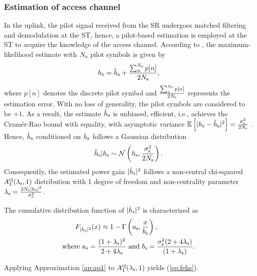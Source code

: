 \subsubsection{Estimation of access channel}
In the uplink, the pilot signal received from the SR undergoes matched filtering and demodulation at the ST, hence, a pilot-based estimation is employed at the ST to acquire the knowledge of the access channel. According to \cite{Gifford08}, the maximum-likelihood estimate with $N_{\text{s}}$ pilot symbols is given by 
\begin{align}
h_{\text{s}} = \hat{h}_{\text{s}} + \frac{\sum^{N_{\text{s}}}_{n} p[n]}{2 N_{\text{s}}},
\label{eq:pilot_MLE}
\end{align}
where $p[n]$ denotes the discrete pilot symbol and $\frac{\sum^{N_{\text{s}}}_{n} p[n]}{2 N_{\text{s}}}$ represents the estimation error. With no loss of generality, the pilot symbols are considered to be $+1$.
As a result, the estimate $\hat{h}_{\text{s}}$ is unbiased, efficient, i.e., achieves the Cram\'er-Rao bound with equality, with asymptotic variance ${\mathbb E}_{}\left[ |h_{\text{s}} -\hat{h}_{\text{s}}|^2 \right] = \frac{\sigma^2_{\text{s}}}{2 N_{\text{s}}}$ \cite{Gifford08}. Hence, $\hat{h}_{\text{s}}$ conditioned on $h_{\text{s}}$ follows a Gaussian distribution
\begin{align}
\hat{h}_{\text{s}}|h_{\text{s}} \sim \mathcal{N}\left( h_{\text{s}},\frac{\sigma^2_{\text{s}}}{2 N_{\text{s}}} \right).
\label{eq:ehs} 
\end{align}
Consequently, the estimated power gain $|\hat{h}_{\text{s}}|^2$ follows a non-central chi-squared $\ncchi2(\ls, 1)$ distribution with 1 degree of freedom and non-centrality parameter $\lambda_{\text{s}} = \frac{2 N_{\text{s}} |h_{\text{s}}|^2}{\sigma^2_{\text{s}}}$. 
\begin{lemma} \label{lm:lm2}
\normalfont
The cumulative distribution function of $|\hat{h}_{\text{s}}|^2$ is characterized as 
\begin{align}
F_{|\hat{h}_{\text{s}}|^2}(x) \approx 1 - \Gamma&\left(a_{\text{s}}, \frac{x}{b_{\text{s}}}\right) \label{eq:fehs},\\ 
\text{where  } a_{\text{s}} = \frac{(1 + \lambda_{\text{s}})^2}{2 + 4 \lambda_{\text{s}}} &\text{ and } b_{\text{s}} = \frac{\sigma^2_{\text{s}} (2 + 4 \lambda_{\text{s}})}{(1 + \lambda_{\text{s}})}. \label{eq:para_s} 
\end{align} 
\end{lemma}
\begin{IEEEproof}
Applying Approximation \ref{ap:ap1} to $\ncchi2(\ls,1 )$ yields (\ref{eq:fehs}). 
\end{IEEEproof}

